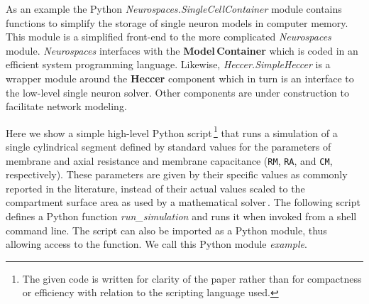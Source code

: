 \documentclass[12pt]{article}
\begin{document}
As an example the Python {\it Neurospaces.SingleCellContainer} module
contains functions to simplify the storage of single neuron models in
computer memory.  This module is a simplified front-end to the more
complicated {\it Neurospaces} module.  {\it Neurospaces} interfaces
with the {\bf Model\,Container} which is coded in an efficient system
programming language.  Likewise, {\it Heccer.SimpleHeccer} is a
wrapper module around the {\bf Heccer} component which in turn is an
interface to the low-level single neuron solver.  Other components are
under construction to facilitate network modeling.

Here we show a simple high-level Python script\,\footnote{The given code
  is written for clarity of the paper rather than for compactness or
  efficiency with relation to the scripting language used.} that runs
a simulation of a single cylindrical segment defined by standard
values for the parameters of membrane and axial resistance and
membrane capacitance ({\tt RM}, {\tt RA},
and {\tt CM}, respectively).  These parameters are given by their
specific values as commonly reported in the literature, instead of
their actual values scaled to the compartment surface area as used by
a mathematical solver\,\cite{cornelis04:_neuros_param_handl}. The following
script defines a Python function {\it run\_simulation} and runs it
when invoked from a shell command line.  The script can also be
imported as a Python module, thus allowing access to the function.  We
call this Python module {\it example}.
\end{document}
